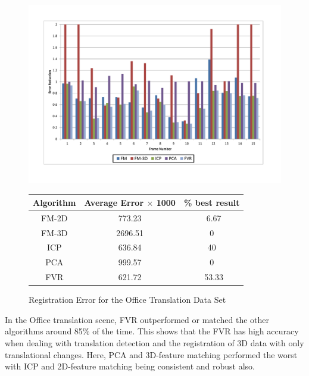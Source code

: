 \begin{figure}
\centering
\includegraphics[width=6in]{images/results/Office_Texture_Translation}
\caption{Registration Error for the Office Translation Data Set}
\label{fig:PET12}

\begin{tabular}{ccc}
\hline
\textbf{Algorithm} & \textbf{Average Error $\times$ 1000} & \textbf{\% best result}\\ \hline
FM-2D	& 773.23 & ~6.67\\
FM-3D	& 2696.51 & 0\\
ICP		& 636.84 & 40\\
PCA		& 999.57 & 0\\
FVR		& 621.72 & ~53.33\\
\end{tabular}
\label{tab:PET12ST}
\end{figure} 


In the Office translation scene, FVR outperformed or matched the other algorithms around 85\% of the time. This shows that the FVR has high accuracy when dealing with translation detection and the registration of 3D data with only translational changes. Here, PCA and 3D-feature matching performed the worst with ICP and 2D-feature matching being consistent and robust also. \\



